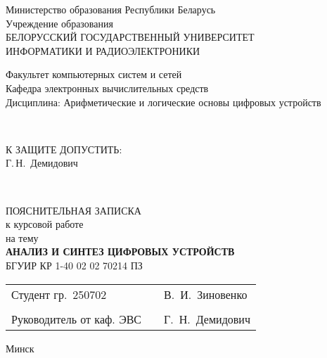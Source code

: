 \begin{titlepage}
    \begin{center}
      Министерство образования Республики Беларусь\\[1em]
      Учреждение образования\\
      БЕЛОРУССКИЙ ГОСУДАРСТВЕННЫЙ УНИВЕРСИТЕТ\\
      ИНФОРМАТИКИ И РАДИОЭЛЕКТРОНИКИ\\[2em]
  
      \begin{minipage}{\textwidth}
        \begin{flushleft}
          Факультет компьютерных систем и сетей\\
          Кафедра электронных вычислительных средств\\
          Дисциплина: Арифметические и логические основы цифровых устройств
        \end{flushleft}
      \end{minipage}\\[2.5em]


    \begin{flushright}
      \begin{minipage}{0.4\textwidth}
     \hfill\MakeUppercase{К защите допустить:}\\
      \hfill\underline{\hspace*{2.8cm}} Г.\,Н.~Демидович
      \end{minipage}\\[3em]
    \end{flushright}

     
      
      \MakeUppercase{Пояснительная записка}\\
      {к курсовой работе}\\
      {на тему}\\[1em]
       \vspace{2\baselineskip}
      \MakeUppercase{\textbf{Анализ и синтез цифровых устройств}}\\[2em]

        {БГУИР КР 1-40 02 02 70214 ПЗ}\\[2em]

        \vfill
        
      \begin{tabular}{p{}p{}p{}}
        Студент гр.~250702     &&   В.~И.~Зиновенко     \\
                               &&                    \\
        Руководитель от каф. ЭВС&&   Г.~Н.~Демидович     \\[2em]
      \end{tabular}
      

      {\normalsize Минск \the\year}
    \end{center}
\end{titlepage}